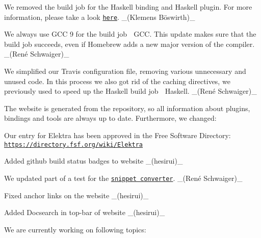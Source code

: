 \begin{DoxyItemize}
\item We removed the build job for the Haskell binding and Haskell plugin. For more information, please take a look \href{https://issues.libelektra.org/2751}{\tt here}. \+\_\+(Klemens Böswirth)\+\_\+
\item We always use G\+CC 9 for the build job {\ttfamily 🍏 G\+CC}. This update makes sure that the build job succeeds, even if Homebrew adds a new major version of the compiler. \+\_\+(René Schwaiger)\+\_\+
\item We simplified our Travis configuration file, removing various unnecessary and unused code. In this process we also got rid of the caching directives, we previously used to speed up the Haskell build job {\ttfamily 🍏 Haskell}. \+\_\+(René Schwaiger)\+\_\+
\end{DoxyItemize}

The website is generated from the repository, so all information about plugins, bindings and tools are always up to date. Furthermore, we changed\+:


\begin{DoxyItemize}
\item Our entry for Elektra has been approved in the Free Software Directory\+: \href{https://directory.fsf.org/wiki/Elektra}{\tt https\+://directory.\+fsf.\+org/wiki/\+Elektra}
\item Added github build status badges to website \+\_\+(hesirui)\+\_\+
\item We updated part of a test for the \href{https://www.libelektra.org/conversion}{\tt snippet converter}. \+\_\+(René Schwaiger)\+\_\+
\item Fixed anchor links on the website \+\_\+(hesirui)\+\_\+
\item Added Docsearch in top-\/bar of website \+\_\+(hesirui)\+\_\+
\end{DoxyItemize}

We are currently working on following topics\+:


